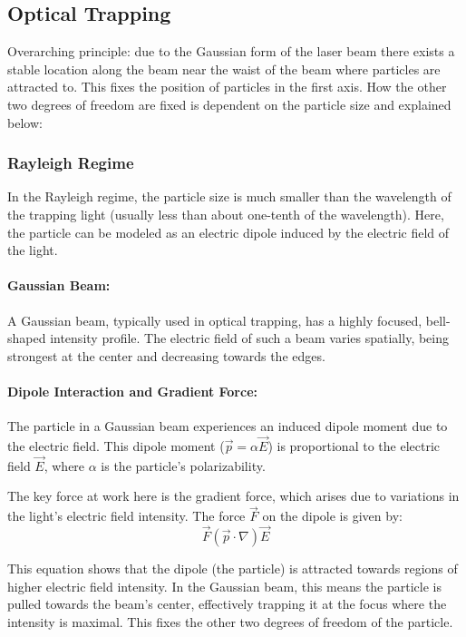 \documentclass[12pt,english]{scrartcl}
\begin{document}
\subsection{Optical Trapping}

Overarching principle: due to the Gaussian form of the laser beam there exists
a stable location along the beam near the waist of the beam where particles are
attracted to. This fixes the position of particles in the first axis. How the
other two degrees of freedom are fixed is dependent on the particle size and
explained below:

\subsubsection{Rayleigh Regime}

In the Rayleigh regime, the particle size is much smaller than the wavelength
of the trapping light (usually less than about one-tenth of the wavelength).
Here, the particle can be modeled as an electric dipole induced by the electric
field of the light.

\paragraph{Gaussian Beam:}
A Gaussian beam, typically used in optical trapping, has a highly focused,
bell-shaped intensity profile. The electric field of such a beam varies
spatially, being strongest at the center and decreasing towards the edges.

\paragraph{Dipole Interaction and Gradient Force:}
The particle in a Gaussian beam experiences an induced dipole moment due to the
electric field. This dipole moment ($\vec{p} = \alpha \vec{E}$) is proportional
to the electric field $\vec{E}$, where $\alpha$ is the particle's
polarizability.

The key force at work here is the gradient force, which arises due to
variations in the light's electric field intensity. The force $\vec{F}$ on the
dipole is given by:
\begin{equation}
	\vec{F} (\vec{p} \cdot \nabla) \vec{E}
\end{equation}

This equation shows that the dipole (the particle) is attracted towards regions
of higher electric field intensity. In the Gaussian beam, this means the
particle is pulled towards the beam's center, effectively trapping it at the
focus where the intensity is maximal. This fixes the other two degrees of
freedom of the particle.\cite{bustamanteOpticalTweezersSinglemolecule2021}
\end{document}
